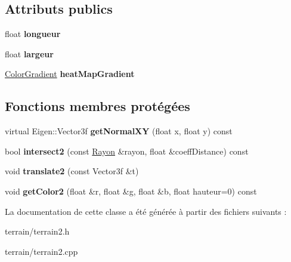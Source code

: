 \subsection*{Attributs publics}
\begin{DoxyCompactItemize}
\item 
\hypertarget{class_terrain2_a83642d32259023e46ab1f878b4fcb55c}{}float {\bfseries longueur}\label{class_terrain2_a83642d32259023e46ab1f878b4fcb55c}

\item 
\hypertarget{class_terrain2_a84edaae22ff658c282c049dd4297d08a}{}float {\bfseries largeur}\label{class_terrain2_a84edaae22ff658c282c049dd4297d08a}

\item 
\hypertarget{class_terrain2_a57e13c689af6e7c567f7975d0a2723c0}{}\hyperlink{class_color_gradient}{Color\+Gradient} {\bfseries heat\+Map\+Gradient}\label{class_terrain2_a57e13c689af6e7c567f7975d0a2723c0}

\end{DoxyCompactItemize}
\subsection*{Fonctions membres protégées}
\begin{DoxyCompactItemize}
\item 
\hypertarget{class_terrain2_affb5aba6abbaff3fc61d476b0a536465}{}virtual Eigen\+::\+Vector3f {\bfseries get\+Normal\+X\+Y} (float x, float y) const \label{class_terrain2_affb5aba6abbaff3fc61d476b0a536465}

\item 
\hypertarget{class_terrain2_a7082d840c5b0d55585be61dd4df1e0c7}{}bool {\bfseries intersect2} (const \hyperlink{class_rayon}{Rayon} \&rayon, float \&coeff\+Distance) const \label{class_terrain2_a7082d840c5b0d55585be61dd4df1e0c7}

\item 
\hypertarget{class_terrain2_a4293b4172bfd8d8f948ccdb18ebf2d03}{}void {\bfseries translate2} (const Vector3f \&t)\label{class_terrain2_a4293b4172bfd8d8f948ccdb18ebf2d03}

\item 
\hypertarget{class_terrain2_a1cc1aa87f9f225dcd5b80d4ee966fcdb}{}void {\bfseries get\+Color2} (float \&r, float \&g, float \&b, float hauteur=0) const \label{class_terrain2_a1cc1aa87f9f225dcd5b80d4ee966fcdb}

\end{DoxyCompactItemize}


La documentation de cette classe a été générée à partir des fichiers suivants \+:\begin{DoxyCompactItemize}
\item 
terrain/terrain2.\+h\item 
terrain/terrain2.\+cpp\end{DoxyCompactItemize}
